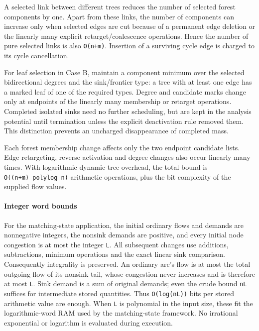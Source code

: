 A selected link between different trees reduces the number of selected forest components by one. Apart from these links, the number of components can increase only when selected edges are cut because of a permanent edge deletion or the linearly many explicit retarget/coalescence operations. Hence the number of pure selected links is also \texttt{O(n+m)}. Insertion of a surviving cycle edge is charged to its cycle cancellation.

For leaf selection in Case B, maintain a component minimum over the selected bidirectional degrees and the sink/frontier type: a tree with at least one edge has a marked leaf of one of the required types. Degree and candidate marks change only at endpoints of the linearly many membership or retarget operations. Completed isolated sinks need no further scheduling, but are kept in the analysis potential until termination unless the explicit deactivation rule removed them. This distinction prevents an uncharged disappearance of completed mass.

Each forest membership change affects only the two endpoint candidate lists. Edge retargeting, reverse activation and degree changes also occur linearly many times. With logarithmic dynamic-tree overhead, the total bound is \texttt{O((n+m)\ polylog\ n)} arithmetic operations, plus the bit complexity of the supplied flow values.

\hypertarget{af-385fd70686-integer-word-bounds}{%
\paragraph{Integer word bounds}\label{af-385fd70686-integer-word-bounds}}

For the matching-state application, the initial ordinary flows and demands are nonnegative integers, the nonsink demands are positive, and every initial node congestion is at most the integer \texttt{L}. All subsequent changes use additions, subtractions, minimum operations and the exact linear sink comparison. Consequently integrality is preserved. An ordinary arc's flow is at most the total outgoing flow of its nonsink tail, whose congestion never increases and is therefore at most \texttt{L}. Sink demand is a sum of original demands; even the crude bound \texttt{nL} suffices for intermediate stored quantities. Thus \texttt{O(log(nL))} bits per stored arithmetic value are enough. When \texttt{L} is polynomial in the input size, these fit the logarithmic-word RAM used by the matching-state framework. No irrational exponential or logarithm is evaluated during execution.

